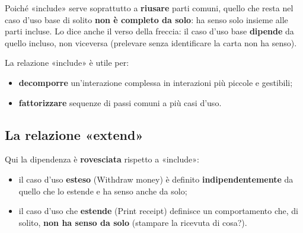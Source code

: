 Poiché «include» serve soprattutto a \textbf{riusare} parti comuni, quello che resta nel caso d'uso base di solito \textbf{non è
completo da solo}: ha senso solo insieme alle parti incluse. Lo dice anche il verso della freccia: il caso d'uso base
\textbf{dipende} da quello incluso, non viceversa (prelevare senza identificare la carta non ha senso).

La relazione «include» è utile per:
\begin{itemize}
  \item \textbf{decomporre} un'interazione complessa in interazioni più piccole e gestibili;
  \item \textbf{fattorizzare} sequenze di passi comuni a più casi d'uso.
\end{itemize}

\subsection{La relazione «extend»}


\begin{center}
\end{center}

Qui la dipendenza è \textbf{rovesciata} rispetto a «include»:
\begin{itemize}
  \item il caso d'uso \textbf{esteso} (Withdraw money) è definito \textbf{indipendentemente} da quello che lo estende e ha senso
        anche da solo;
  \item il caso d'uso che \textbf{estende} (Print receipt) definisce un comportamento che, di solito, \textbf{non ha senso da solo}
        (stampare la ricevuta di cosa?).
\end{itemize}

